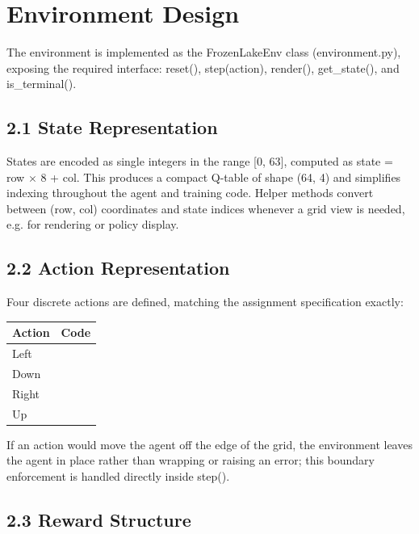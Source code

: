 \documentclass[11pt]{article}
\begin{document}
\section{Environment Design}

The environment is implemented as the FrozenLakeEnv class (environment.py), exposing the required interface: reset(), step(action), render(), get\_state(), and is\_terminal().

\subsection*{2.1 State Representation}

States are encoded as single integers in the range [0, 63], computed as state = row $\times$ 8 + col. This produces a compact Q-table of shape (64, 4) and simplifies indexing throughout the agent and training code. Helper methods convert between (row, col) coordinates and state indices whenever a grid view is needed, e.g. for rendering or policy display.

\subsection*{2.2 Action Representation}

Four discrete actions are defined, matching the assignment specification exactly:

\begin{center}
\begin{tabular}{>{\raggedright}p{2.3in} >{\raggedright\arraybackslash}p{1.6in}}
\toprule
\rowcolor{tablehead}\textbf{Action} & \textbf{Code} \\
\midrule
Left & 0 \\
Down & 1 \\
Right & 2 \\
Up & 3 \\
\bottomrule
\end{tabular}
\end{center}

If an action would move the agent off the edge of the grid, the environment leaves the agent in place rather than wrapping or raising an error; this boundary enforcement is handled directly inside step().

\subsection*{2.3 Reward Structure}
\end{document}
